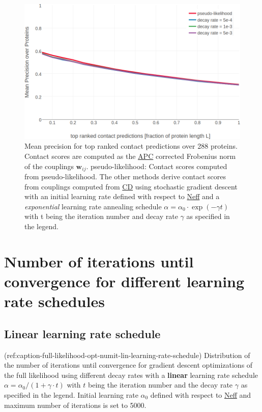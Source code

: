 \documentclass[11pt,a4paper,twoside]{book}
\newcommand{\wij}{\mathbf{w}_{ij}}
\theoremstyle{definition}
\theoremstyle{definition}
\theoremstyle{remark}
\begin{document}
\begin{figure}

{\centering \includegraphics[width=1\linewidth]{img/full_likelihood/appendix/precision_vs_rank_alpha0_0_exp_decayrate} 

}

\caption{Mean precision for top ranked
contact predictions over 288 proteins. Contact scores are computed as
the \protect\hyperlink{abbrev}{APC} corrected Frobenius norm of the
couplings \(\wij\). pseudo-likelihood: Contact scores computed from
pseudo-likelihood. The other methods derive contact scores from
couplings computed from \protect\hyperlink{abbrev}{CD} using stochastic
gradient descent with an initial learning rate defined with respect to
\protect\hyperlink{abbrev}{Neff} and a \emph{exponential} learning rate
annealing schedule \(\alpha = \alpha_0 \cdot\exp(- \gamma t)\) with t
being the iteration number and decay rate \(\gamma\) as specified in the
legend.}\label{fig:performance-cd-expschedule}
\end{figure}

\section{Number of iterations until convergence for different learning
rate schedules}\label{learning-rate-schedules-distribution-iterations}

\subsection{Linear learning rate
schedule}\label{linear-learning-rate-schedule-1}

(ref:caption-full-likelihood-opt-numit-lin-learning-rate-schedule)
Distribution of the number of iterations until convergence for gradient
descent optimizations of the full likelihood using different decay rates
with a \textbf{linear} learning rate schedule
\(\alpha = \alpha_0 / (1 + \gamma \cdot t)\) with \(t\) being the
iteration number and the decay rate \(\gamma\) as specified in the
legend. Initial learning rate \(\alpha_0\) defined with respect to
\protect\hyperlink{abbrev}{Neff} and maximum number of iterations is set
to 5000.
\end{document}
